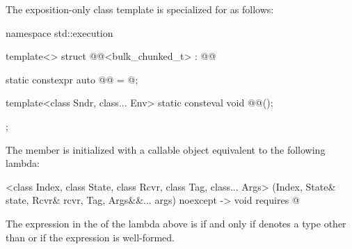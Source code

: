 \pnum
The exposition-only class template 
is specialized for  as follows:
\begin{codeblock}
namespace std::execution {
  template<>
  struct @@<bulk_chunked_t> : @@ {
    static constexpr auto @@ = @\seebelow@;

    template<class Sndr, class... Env>
      static consteval void @@();
  };
}
\end{codeblock}
The member 
is initialized with a callable object equivalent to the following lambda:
\begin{codeblock}
[]<class Index, class State, class Rcvr, class Tag, class... Args>
  (Index, State& state, Rcvr& rcvr, Tag, Args&&... args) noexcept
  -> void requires @
\end{codeblock}
The expression in the  of the lambda above is
 if and only
if  denotes a type other than  or
if the expression  is well-formed.

